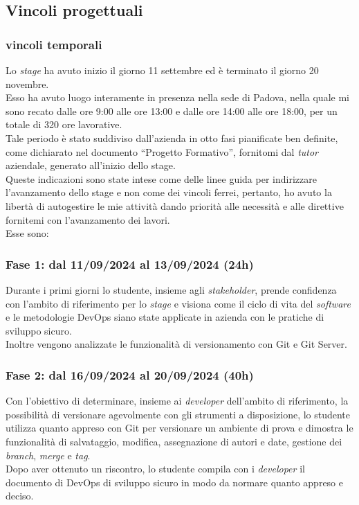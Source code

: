 \subsection{Vincoli progettuali}
\subsubsection*{vincoli temporali}
Lo \emph{stage} ha avuto inizio il giorno 11 settembre ed è terminato il giorno 20 novembre.\\
Esso ha avuto luogo interamente in presenza nella sede di Padova, nella quale mi sono recato dalle ore 9:00 alle ore 13:00 e dalle ore 14:00 alle ore 18:00, per un totale di 320 ore lavorative.\\
Tale periodo è stato suddiviso dall'azienda in otto fasi pianificate ben definite, come dichiarato nel documento “Progetto Formativo”, fornitomi dal \emph{tutor} aziendale, generato all'inizio dello stage.\\
Queste indicazioni sono state intese come delle linee guida per indirizzare l'avanzamento dello stage e non come dei vincoli ferrei, pertanto, ho avuto la libertà di autogestire le mie attività dando priorità alle necessità e alle direttive fornitemi con l'avanzamento dei lavori.\\
Esse sono:
\subsubsection*{Fase 1: dal 11/09/2024 al 13/09/2024 (24h)}
Durante i primi giorni lo studente, insieme agli \emph{stakeholder}, prende confidenza con l'ambito di riferimento per lo \emph{stage} e visiona come il ciclo di vita del \emph{software} e le metodologie \gls{DevOps} siano state applicate in azienda con le pratiche di sviluppo sicuro.\\
Inoltre vengono analizzate le funzionalità di versionamento con Git e Git Server.\\

\subsubsection*{Fase 2: dal 16/09/2024 al 20/09/2024 (40h) }
Con l'obiettivo di determinare, insieme ai \emph{developer} dell'ambito di riferimento, la possibilità di versionare agevolmente con gli strumenti a disposizione, lo studente utilizza quanto appreso con Git per versionare un ambiente di prova e dimostra le funzionalità di salvataggio, modifica, assegnazione di autori e date, gestione dei \emph{branch}, \emph{merge} e \emph{tag}.\\
Dopo aver ottenuto un riscontro, lo studente compila con i \emph{developer} il documento di \gls{DevOps} di sviluppo sicuro in modo da normare quanto appreso e deciso.\\

